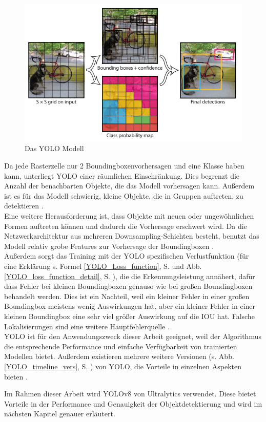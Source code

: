 {	\begin{figure}[ht]
		\centering
		\includegraphics*[scale = 2, keepaspectratio, trim=2 2 2 2 ]{images/YOLO/YOLO_model.png}
		\caption[Das YOLO Modell]{Das YOLO Modell\citep{Redmon2016}}
		\label{YOLO_Model}
 	\end{figure}

	Da jede Rasterzelle nur 2 Boundingboxenvorhersagen und eine Klasse haben kann, unterliegt YOLO einer räumlichen Einschränkung. Dies begrenzt die Anzahl der benachbarten Objekte, die das Modell vorhersagen kann. Außerdem ist es für das Modell schwierig, kleine Objekte, die in Gruppen auftreten, zu detektieren \citep{Redmon2016}. \\
	Eine weitere Herausforderung ist, dass Objekte mit neuen oder ungewöhnlichen Formen auftreten können und dadurch die Vorhersage erschwert wird. Da die Netzwerkarchitektur aus mehreren \glqq Downsampling\grqq{}-Schichten besteht, benutzt das Modell relativ grobe Features zur Vorhersage der Boundingboxen \citep{Redmon2016}. \\
	Außerdem sorgt das Training mit der YOLO spezifischen Verlustfunktion (für eine Erklärung s.  Formel \ref{YOLO_Loss_function}, S. \pageref{YOLO_Loss_function} und Abb.  \ref{YOLO_loss_function_detail}, S. \pageref{YOLO_loss_function_detail}), die die Erkennungsleistung annähert, dafür dass Fehler bei kleinen Boundingboxen genauso wie bei großen Boundingboxen behandelt werden. Dies ist ein Nachteil, weil ein kleiner Fehler in einer großen Boundingbox meistens wenig Auswirkungen hat, aber ein kleiner Fehler in einer kleinen Boundingbox eine sehr viel größer Auswirkung auf die IOU hat. Falsche Lokalisierungen sind eine weitere Hauptfehlerquelle \citep{Redmon2016}. \\
	YOLO ist für den Anwendungszweck dieser Arbeit geeignet, weil der Algorithmus die entsprechende Performance und einfache Verfügbarkeit von trainierten Modellen bietet. Außerdem existieren mehrere weitere Versionen (s. Abb. \ref{YOLO_timeline_vers}, S. \pageref{YOLO_timeline_vers}) von YOLO, die Vorteile in einzelnen Aspekten bieten \citep{Terven2023}. 

	Im Rahmen dieser Arbeit wird YOLOv8 von Ultralytics verwendet. Diese bietet Vorteile in der Performance und Genauigkeit der Objektdetektierung und wird im nächsten Kapitel genauer erläutert. 
	} 

